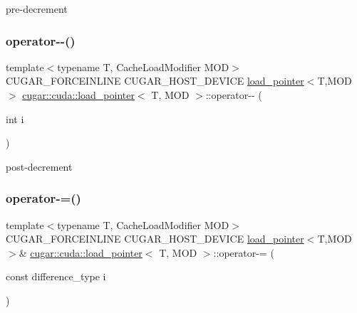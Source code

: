 pre-\/decrement \mbox{\label{structcugar_1_1cuda_1_1load__pointer_afbac0cb3cc367c03f6f2922c330466f0}} 
\subsubsection{\texorpdfstring{operator-\/-\/()}{operator--()}\hspace{0.1cm}{\footnotesize\ttfamily [2/2]}}
{\footnotesize\ttfamily template$<$typename T, Cache\+Load\+Modifier M\+OD$>$ \\
C\+U\+G\+A\+R\+\_\+\+F\+O\+R\+C\+E\+I\+N\+L\+I\+NE C\+U\+G\+A\+R\+\_\+\+H\+O\+S\+T\+\_\+\+D\+E\+V\+I\+CE \hyperlink{structcugar_1_1cuda_1_1load__pointer}{load\+\_\+pointer}$<$T,M\+OD$>$ \hyperlink{structcugar_1_1cuda_1_1load__pointer}{cugar\+::cuda\+::load\+\_\+pointer}$<$ T, M\+OD $>$\+::operator-\/-\/ (\begin{DoxyParamCaption}\item[{int}]{i }\end{DoxyParamCaption})\hspace{0.3cm}{\ttfamily [inline]}}

post-\/decrement \mbox{\label{structcugar_1_1cuda_1_1load__pointer_a3f0eaa22c27c01573d432839c2210d83}} 
\subsubsection{\texorpdfstring{operator-\/=()}{operator-=()}}
{\footnotesize\ttfamily template$<$typename T, Cache\+Load\+Modifier M\+OD$>$ \\
C\+U\+G\+A\+R\+\_\+\+F\+O\+R\+C\+E\+I\+N\+L\+I\+NE C\+U\+G\+A\+R\+\_\+\+H\+O\+S\+T\+\_\+\+D\+E\+V\+I\+CE \hyperlink{structcugar_1_1cuda_1_1load__pointer}{load\+\_\+pointer}$<$T,M\+OD$>$\& \hyperlink{structcugar_1_1cuda_1_1load__pointer}{cugar\+::cuda\+::load\+\_\+pointer}$<$ T, M\+OD $>$\+::operator-\/= (\begin{DoxyParamCaption}\item[{const difference\+\_\+type}]{i }\end{DoxyParamCaption})\hspace{0.3cm}{\ttfamily [inline]}}

